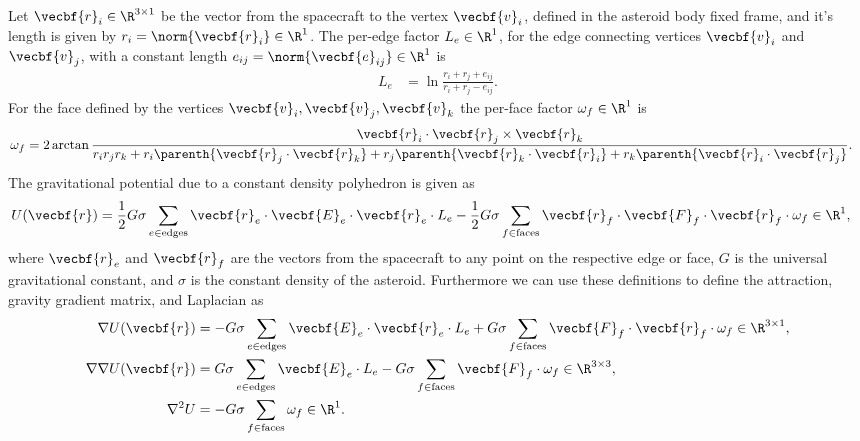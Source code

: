 \documentclass[11pt, reqno]{article}    %
\begin{document}
Let \( \vecbf{r}_i \in \R^{3 \times 1} \) be the vector from the spacecraft to the vertex \( \vecbf{v}_i \), defined in the asteroid body fixed frame, and it's length is given by \( r_i = \norm{\vecbf{r}_i} \in \R^{1} \).
The per-edge factor \( L_e \in \R^{1}\), for the edge connecting vertices \( \vecbf{v}_i \) and \( \vecbf{v}_j \), with a constant length \( e_{ij} = \norm{\vecbf{e}_{ij}} \in \R^1\) is
\begin{align}\label{eq:edge_factor}
    L_e &= \ln \frac{r_i + r_j + e_{ij}}{r_i + r_j - e_{ij}}.
\end{align}
For the face defined by the vertices \( \vecbf{v}_i, \vecbf{v}_j, \vecbf{v}_k \) the per-face factor \( \omega_f \in \R^{1} \) is
\begin{align}\label{eq:face_factor}
    \omega_f &= 2 \arctan \frac{\vecbf{r}_i \cdot \vecbf{r}_j \times \vecbf{r}_k}{r_i r_j r_k + r_i \parenth{\vecbf{r}_j \cdot \vecbf{r}_k} + r_j \parenth{\vecbf{r}_k \cdot \vecbf{r}_i} + r_k \parenth{\vecbf{r}_i \cdot \vecbf{r}_j}} .
\end{align}
The gravitational potential due to a constant density polyhedron is given as
\begin{align}\label{eq:potential}
    U(\vecbf{r}) &= \frac{1}{2} G \sigma \sum_{e \in \text{edges}} \vecbf{r}_e \cdot \vecbf{E}_e \cdot \vecbf{r}_e \cdot L_e - \frac{1}{2}G \sigma \sum_{f \in \text{faces}} \vecbf{r}_f \cdot \vecbf{F}_f \cdot \vecbf{r}_f \cdot \omega_f \in \R^1,
\end{align}
where \( \vecbf{r}_e\) and \(\vecbf{r}_f \) are the vectors from the spacecraft to any point on the respective edge or face, \( G\) is the universal gravitational constant, and \( \sigma \) is the constant density of the asteroid.
Furthermore we can use these definitions to define the attraction, gravity gradient matrix, and Laplacian as
\begin{align}
    \nabla U ( \vecbf{r} ) &= -G \sigma \sum_{e \in \text{edges}} \vecbf{E}_e \cdot \vecbf{r}_e \cdot L_e + G \sigma \sum_{f \in \text{faces}} \vecbf{F}_f \cdot \vecbf{r}_f \cdot \omega_f \in \R^{3 \times 1} , \label{eq:attraction}\\
    \nabla \nabla U ( \vecbf{r} ) &= G \sigma \sum_{e \in \text{edges}} \vecbf{E}_e  \cdot L_e - G \sigma \sum_{f \in \text{faces}} \vecbf{F}_f \cdot \omega_f \in \R^{3 \times 3}, \label{eq:gradient_matrix}\\
    \nabla^2 U &= -G \sigma \sum_{f \in \text{faces}}  \omega_f \in \R^1 .\label{eq:laplacian}
\end{align}
\end{document}
